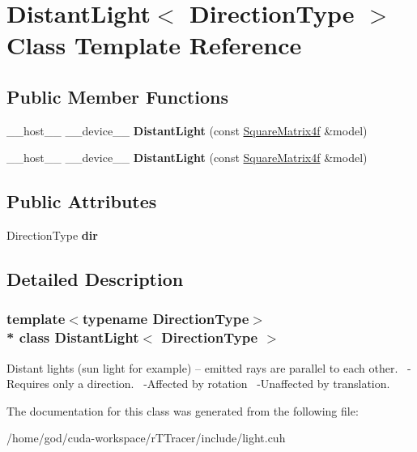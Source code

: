 \hypertarget{class_distant_light}{}\section{Distant\+Light$<$ Direction\+Type $>$ Class Template Reference}
\label{class_distant_light}
\subsection*{Public Member Functions}
\begin{DoxyCompactItemize}
\item 
\+\_\+\+\_\+host\+\_\+\+\_\+ \+\_\+\+\_\+device\+\_\+\+\_\+ {\bfseries Distant\+Light} (const \hyperlink{class_square_matrix4}{Square\+Matrix4f} \&model)\hypertarget{class_distant_light_a3565f9a26a0a865abf37c72ed63a7286}{}\label{class_distant_light_a3565f9a26a0a865abf37c72ed63a7286}

\item 
\+\_\+\+\_\+host\+\_\+\+\_\+ \+\_\+\+\_\+device\+\_\+\+\_\+ {\bfseries Distant\+Light} (const \hyperlink{class_square_matrix4}{Square\+Matrix4f} \&model)\hypertarget{class_distant_light_a3565f9a26a0a865abf37c72ed63a7286}{}\label{class_distant_light_a3565f9a26a0a865abf37c72ed63a7286}

\end{DoxyCompactItemize}
\subsection*{Public Attributes}
\begin{DoxyCompactItemize}
\item 
Direction\+Type {\bfseries dir}\hypertarget{class_distant_light_a6931acb5c11fddc6a6ea27091ca7c95f}{}\label{class_distant_light_a6931acb5c11fddc6a6ea27091ca7c95f}

\end{DoxyCompactItemize}


\subsection{Detailed Description}
\subsubsection*{template$<$typename Direction\+Type$>$\\*
class Distant\+Light$<$ Direction\+Type $>$}

Distant lights (sun light for example) -- emitted rays are parallel to each other.~\newline
 -\/\+Requires only a direction.~\newline
 -\/\+Affected by rotation~\newline
 -\/\+Unaffected by translation.~\newline


The documentation for this class was generated from the following file\+:\begin{DoxyCompactItemize}
\item 
/home/god/cuda-\/workspace/r\+T\+Tracer/include/light.\+cuh\end{DoxyCompactItemize}
